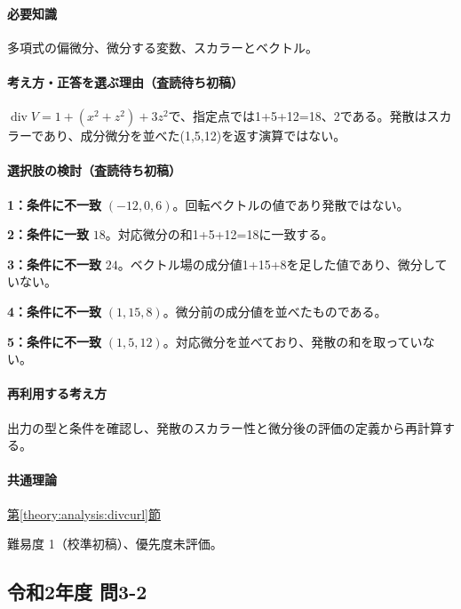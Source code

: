 \paragraph{必要知識} 多項式の偏微分、微分する変数、スカラーとベクトル。

\paragraph{考え方・正答を選ぶ理由（査読待ち初稿）} \(\operatorname{div}V=1+(x^2+z^2)+3z^2\)で、指定点では1+5+12=\allowbreak{}18、2である。発散はスカラーであり、成分微分を並べた(1,5,12)を返す演算ではない。

\paragraph{選択肢の検討（査読待ち初稿）}\mbox{}\par

\noindent\textbf{1：条件に不一致} \((-12,0,6)\)。回転ベクトルの値であり発散ではない。\par

\noindent\textbf{2：条件に一致} \(18\)。対応微分の和1+5+12=\allowbreak{}18に一致する。\par

\noindent\textbf{3：条件に不一致} \(24\)。ベクトル場の成分値1+15+8を足した値であり、微分していない。\par

\noindent\textbf{4：条件に不一致} \((1,15,8)\)。微分前の成分値を並べたものである。\par

\noindent\textbf{5：条件に不一致} \((1,5,12)\)。対応微分を並べており、発散の和を取っていない。\par

\paragraph{再利用する考え方} 出力の型と条件を確認し、発散のスカラー性と微分後の評価の定義から再計算する。

\paragraph{共通理論} \hyperref[theory:analysis:divcurl]{第\ref*{theory:analysis:divcurl}節}

\par 難易度 1（校準初稿）、優先度未評価。

\subsection{令和2年度 問3-2}
\label{q:r02-reg-basic-3-2}

